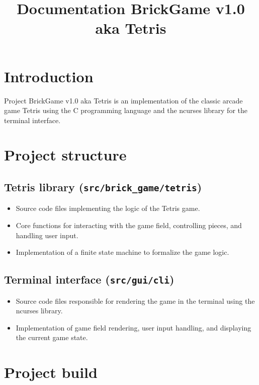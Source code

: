 \documentclass{article}
\begin{document}
\title{Documentation BrickGame v1.0 aka Tetris}
\date{}
\maketitle

\section{Introduction}

Project BrickGame v1.0 aka Tetris is an implementation of the classic arcade game Tetris using the C programming language and the ncurses library for the terminal interface.

\section{Project structure}

\subsection{Tetris library (\texttt{src/brick\_game/tetris})}

\begin{itemize}[label=--]
    \item Source code files implementing the logic of the Tetris game.
    \item Core functions for interacting with the game field, controlling pieces, and handling user input.
    \item Implementation of a finite state machine to formalize the game logic.
\end{itemize}

\subsection{Terminal interface (\texttt{src/gui/cli})}

\begin{itemize}[label=--]
    \item Source code files responsible for rendering the game in the terminal using the ncurses library.
    \item Implementation of game field rendering, user input handling, and displaying the current game state.
\end{itemize}

\section{Project build}
\end{document}
